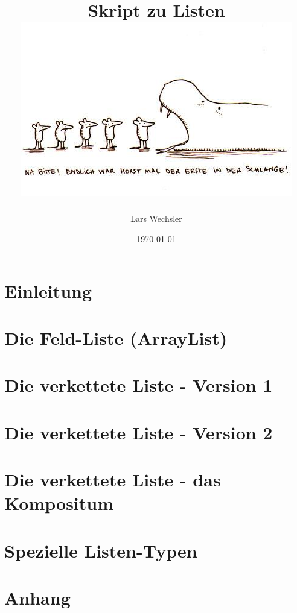 \documentclass{article}
\author{Lars Wechsler}
\title{Skript zu Listen \\ \centering\includegraphics[scale=0.80]{../media/title.jpg}}
\date{\today}
\begin{document}
\maketitle
\newpage 

\tableofcontents
\section{Einleitung}



\newpage

\section{Die Feld-Liste (ArrayList)}



\newpage



\newpage

\section{Die verkettete Liste - Version 1}





\newpage

\section{Die verkettete Liste - Version 2}



\newpage

\section{Die verkettete Liste - das Kompositum}





\newpage

\section{Spezielle Listen-Typen}



\newpage

\section{Anhang}


\end{document}
